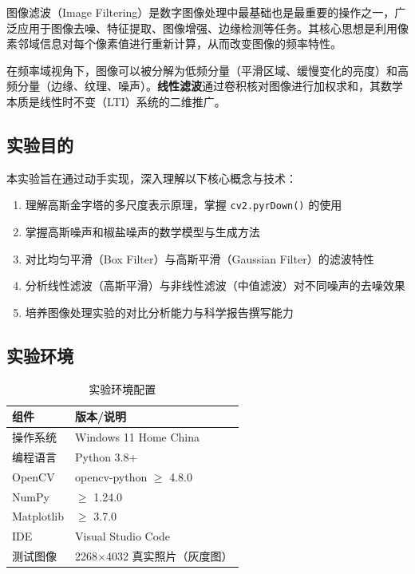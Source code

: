 \documentclass[12pt,a4paper]{ctexart}
\begin{document}
图像滤波（Image Filtering）是数字图像处理中最基础也是最重要的操作之一，广泛应用于图像去噪、特征提取、图像增强、边缘检测等任务。其核心思想是利用像素邻域信息对每个像素值进行重新计算，从而改变图像的频率特性。

在频率域视角下，图像可以被分解为低频分量（平滑区域、缓慢变化的亮度）和高频分量（边缘、纹理、噪声）。\textbf{线性滤波}通过卷积核对图像进行加权求和，其数学本质是线性时不变（LTI）系统的二维推广。

\subsection{实验目的}

本实验旨在通过动手实现，深入理解以下核心概念与技术：

\begin{enumerate}[leftmargin=*]
    \item 理解高斯金字塔的多尺度表示原理，掌握 \texttt{cv2.pyrDown()} 的使用
    \item 掌握高斯噪声和椒盐噪声的数学模型与生成方法
    \item 对比均匀平滑（Box Filter）与高斯平滑（Gaussian Filter）的滤波特性
    \item 分析线性滤波（高斯平滑）与非线性滤波（中值滤波）对不同噪声的去噪效果
    \item 培养图像处理实验的对比分析能力与科学报告撰写能力
\end{enumerate}

\subsection{实验环境}

\begin{table}[H]
    \centering
    \caption{实验环境配置}
    \begin{tabular}{ll}
        \toprule
        \textbf{组件} & \textbf{版本/说明} \\
        \midrule
        操作系统 & Windows 11 Home China \\
        编程语言 & Python 3.8+ \\
        OpenCV & opencv-python $\ge$ 4.8.0 \\
        NumPy & $\ge$ 1.24.0 \\
        Matplotlib & $\ge$ 3.7.0 \\
        IDE & Visual Studio Code \\
        测试图像 & 2268$\times$4032 真实照片（灰度图） \\
        \bottomrule
    \end{tabular}
\end{table}
\end{document}
